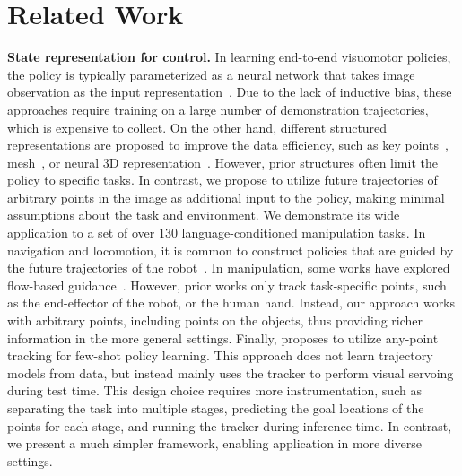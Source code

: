 \section{Related Work}
\noindent\textbf{State representation for control.}
In learning end-to-end visuomotor policies, the policy is typically parameterized as a neural network that takes image observation as the input representation~\cite{reed2022generalist,brohan2022rt,walke2023bridgedata}. Due to the lack of inductive bias, these approaches require training on a large number of demonstration trajectories, which is expensive to collect. On the other hand, different structured representations are proposed to improve the data efficiency, such as key points~\cite{qin2020keto,manuelli2020keypoints}, mesh~\cite{lin2021VCD,huang2022medor}, or neural 3D representation~\cite{li20213d,rashid2023language}. However, prior structures often limit the policy to specific tasks. In contrast, we propose to utilize future trajectories of arbitrary points in the image as additional input to the policy, making minimal assumptions about the task and environment. We demonstrate its wide application to a set of over 130 language-conditioned manipulation tasks. In navigation and locomotion, it is common to construct policies that are guided by the future trajectories of the robot~\cite{aguiar2007trajectory,peng2018deepmimic}. In manipulation, some works have explored flow-based guidance~\cite{goyal2022ifor,seita2023toolflownet,gu2023rt}. However, prior works only track task-specific points, such as the end-effector of the robot, or the human hand. Instead, our approach works with arbitrary points, including points on the objects, thus providing richer information in the more general settings. Finally, \citet{vecerik2023robotap} proposes to utilize any-point tracking for few-shot policy learning. This approach does not learn trajectory models from data, but instead mainly uses the tracker to perform visual servoing during test time. This design choice requires more instrumentation, such as separating the task into multiple stages, predicting the goal locations of the points for each stage, and running the tracker during inference time. In contrast, we present a much simpler framework, enabling application in more diverse settings.

